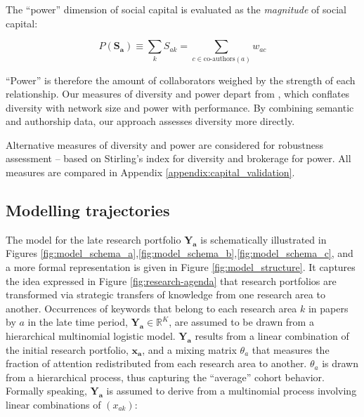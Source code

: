 \documentclass{article}
\begin{document}
The ``power'' dimension of social capital is evaluated as the \textit{magnitude} of social capital:

\begin{equation}
    P(\bm{S_a})\equiv \sum_k S_{ak} = \sum_{c \in \text{co-authors}(a)} w_{ac}
\end{equation}

``Power'' is therefore the amount of collaborators weighed by the strength of each relationship. Our measures of diversity and power depart from \citealt{Abbasi2014}, which conflates diversity with network size and power with performance. By combining semantic and authorship data, our approach assesses diversity more directly. %

Alternative measures of diversity and power are considered for robustness assessment -- based on Stirling's index for diversity and brokerage for power. All measures are compared in Appendix \ref{appendix:capital_validation}. 

\subsection{\label{sec:model}Modelling trajectories}

The model for the late research portfolio $\bm{Y_a}$ is schematically illustrated in Figures \ref{fig:model_schema_a},\ref{fig:model_schema_b},\ref{fig:model_schema_c}, and a more formal representation is given in Figure \ref{fig:model_structure}. It captures the idea expressed in Figure \ref{fig:research-agenda} that research portfolios are transformed via strategic transfers of knowledge from one research area to another. Occurrences of keywords that belong to each research area $k$ in papers by $a$ in the late time period, $\bm{Y_{a}} \in \mathbb{R}^K$, are assumed to be drawn from a hierarchical multinomial logistic model. $\bm{Y_{a}}$ results from a linear combination of the initial research portfolio, $\bm{x_{a}}$, and a mixing matrix $\theta_a$ that measures the fraction of attention redistributed from each research area to another. $\theta_a$ is drawn from a hierarchical process, thus capturing the ``average'' cohort behavior. %
Formally speaking, $\bm{Y_{a}}$ is assumed to derive from a multinomial process involving linear combinations of $(x_{ak})$:
\end{document}
